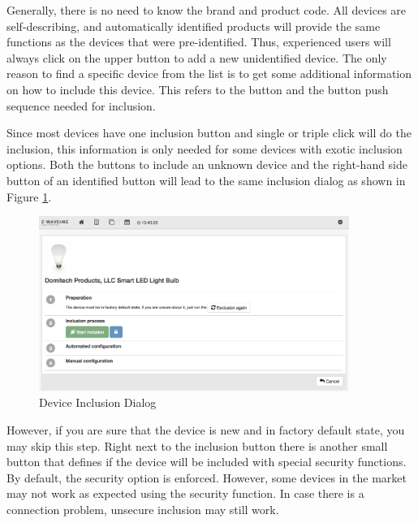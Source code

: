 Generally, there is no need to know the \zwave brand and product code. All \zwave devices 
are self-describing, and automatically identified products will provide the same functions 
as the devices that were pre-identified. Thus, experienced users will always click on 
the upper button to add a new unidentified \zwave device. The only reason to find a 
specific device from the list is to get some additional information on how to include this 
device. This refers to the button and the button push sequence needed for inclusion.

Since most \zwave devices have one \zwave inclusion button and single or triple click 
will do the inclusion, this information is only needed for some devices with exotic 
inclusion options. Both the buttons to include an unknown device and the right-hand 
side button of an identified button will lead to the same inclusion dialog as 
shown in Figure \ref{device3}.

\begin{figure}
\begin{center}
\includegraphics[width=0.9\textwidth]{pngs/cap4/device3.png}
\caption{\zwave Device Inclusion Dialog}
\label{device3}
\end{center}
\end{figure}



However, 
if you are sure that the device is new and in factory default state, you may skip this 
step. Right next to the inclusion button there is another small button that defines if the 
device will be included with special security functions. By default, the security option 
is enforced. However, some devices in the market may not work as expected using the 
security function. In case there is a connection problem, unsecure inclusion may still work.

